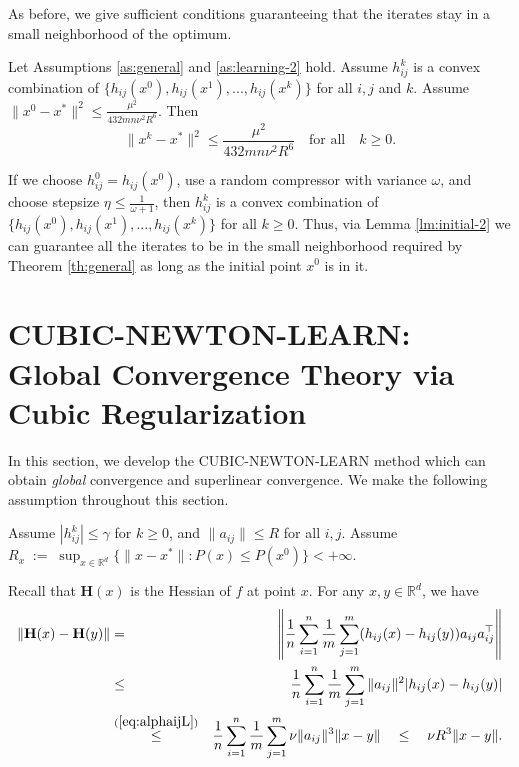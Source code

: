 \documentclass[12pt]{article}
\newcommand{\eqdef}{\; { := }\;}
\newcommand{\R}{\mathbb{R}}
\newcommand{\newalpha}{h}
\newcommand{\mH}{\mathbf{H}}
\begin{document}
As before, we give sufficient conditions guaranteeing that the iterates stay in a small neighborhood of the optimum.
\begin{lemma}\label{lm:initial-2}
	Let Assumptions \ref{as:general} and \ref{as:learning-2} hold. Assume $h_{ij}^k$ is a convex combination of $\{  \newalpha_{ij}(x^0), \newalpha_{ij}(x^1), ..., \newalpha_{ij}(x^k)  \}$ for all $i,j$ and $k$. Assume $\|x^0 - x^*\|^2 \leq \frac{\mu^2}{432mn \nu^2R^6}$. Then 	$$
	\|x^k - x^*\|^2 \leq \frac{\mu^2}{432mn \nu^2R^6} \quad \text{for all} \quad k\geq 0. $$
\end{lemma}


If we choose $h_{ij}^0 = \newalpha_{ij}(x^0)$, use a random  compressor with variance $\omega$, and choose stepsize $\eta \leq \frac{1}{\omega + 1}$, then $h_{ij}^k$ is a convex combination of $\{  \newalpha_{ij}(x^0), \newalpha_{ij}(x^1), ..., \newalpha_{ij}(x^k)  \}$ for all $k\geq 0$. Thus, via Lemma \ref{lm:initial-2} we can guarantee all the iterates to be in the small neighborhood required by Theorem \ref{th:general} as long as the initial point $x^0$ is in it.  





\section{{\sf CUBIC-NEWTON-LEARN}: Global Convergence Theory via Cubic Regularization} \label{sec:CUBIC-NEWTON-LEARN}



In this section, we develop the {\sf CUBIC-NEWTON-LEARN} method which can obtain {\em global} convergence and superlinear convergence.  We make the following assumption throughout this section.

\begin{assumption}\label{as:cubic}
	Assume $|h_{ij}^k| \leq \gamma$ for $k\geq 0$, and $\|a_{ij}\| \leq R$ for all $i,j$. Assume $R_x \eqdef \sup_{x\in \R^d} \{  \|x-x^*\| : P(x) \leq P(x^0)  \} < + \infty$. 
\end{assumption}


Recall that $\mH(x)$ is the Hessian of $f$ at point $x$. For any $x, y \in \R^d$, we have 
\begin{eqnarray*}
\|\mH(x) - \mH(y)\|	&= & \left\| \frac{1}{n} \sum \limits_{i=1}^n \frac{1}{m} \sum\limits_{j=1}^{m}( \newalpha_{ij}(x) - \newalpha_{ij}(y) )a_{ij}a_{ij}^\top  \right\| \\ 
&\leq & \frac{1}{n} \sum\limits_{i=1}^n \frac{1}{m} \sum\limits_{j=1}^{m} \|a_{ij}\|^2 |\newalpha_{ij}(x) - \newalpha_{ij}(y)| \\ 
&\overset{(\ref{eq:alphaijL})}{\leq} & \frac{1}{n} \sum\limits_{i=1}^n \frac{1}{m} \sum\limits_{j=1}^{m} \nu \|a_{ij}\|^3 \|x-y\| \quad \leq \quad \nu R^3 \|x-y\|. 
\end{eqnarray*}
\end{document}
